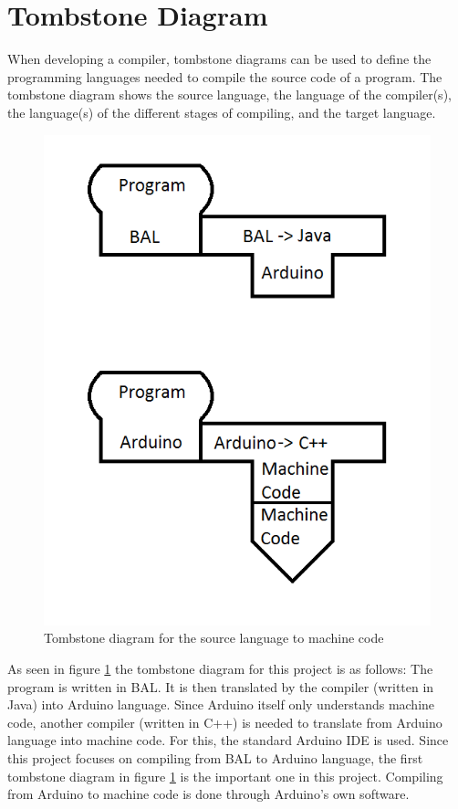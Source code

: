 \section{Tombstone Diagram}
When developing a compiler, tombstone diagrams can be used to define the programming languages needed to compile the source code of a program. The tombstone diagram shows the source language, the language of the compiler(s), the language(s) of the different stages of compiling, and the target language.

\begin{figure}[H]
	\centering
		\includegraphics{billeder/tombstone_diagram.png}
		\caption{Tombstone diagram for the source language to machine code}
		\label{fig:tombstone}
\end{figure}

As seen in figure \ref{fig:tombstone} the tombstone diagram for this project is as follows: The program is written in BAL. It is then translated by the compiler (written in Java) into Arduino language. Since Arduino itself only understands machine code, another compiler (written in C++) is needed to translate from Arduino language into machine code. For this, the standard Arduino IDE is used.
Since this project focuses on compiling from BAL to Arduino language, the first tombstone diagram in figure \ref{fig:tombstone} is the important one in this project. Compiling from Arduino to machine code is done through Arduino's own software.
